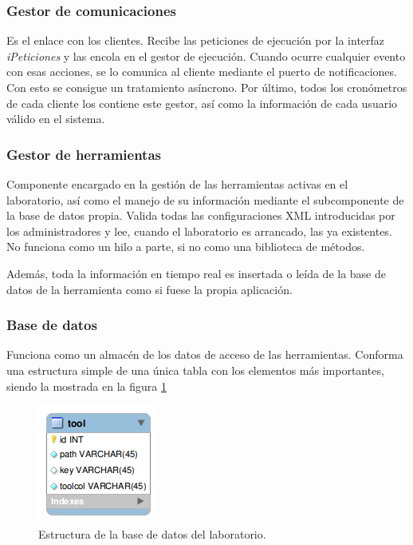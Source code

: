 \subsubsection{Gestor de comunicaciones}
Es el enlace con los clientes. Recibe las peticiones de ejecución por 
la interfaz \emph{iPeticiones} y las encola en el gestor de ejecución. 
Cuando ocurre cualquier evento con esas acciones, se lo comunica al 
cliente mediante el puerto de notificaciones. Con esto se consigue un 
tratamiento asíncrono. Por último, todos los cronómetros de cada 
cliente los contiene este gestor, así como la información de cada 
usuario válido en el sistema.

\subsubsection{Gestor de herramientas}
Componente encargado en la gestión de las herramientas activas en el 
laboratorio, así como el manejo de su información mediante el 
subcomponente de la base de datos propia. Valida todas las 
configuraciones XML introducidas por los administradores y lee, cuando 
el laboratorio es arrancado, las ya existentes. No funciona como un 
hilo a parte, si no como una biblioteca de métodos.

Además, toda la información en tiempo real es insertada o leída de 
la base de datos de la herramienta como si fuese la propia aplicación.

\subsubsection{Base de datos}
Funciona como un almacén de los datos de acceso de las herramientas. 
Conforma una estructura simple de una única tabla con los elementos 
más importantes, siendo la mostrada en la figura \ref{fig:erlaboratorio}

\begin{figure}[H]
	\centering
	\includegraphics[scale=0.8]{images/labdata.png}
	\caption[E-R local]{Estructura de la base de datos del laboratorio.}
	\label{fig:erlaboratorio}
\end{figure}

